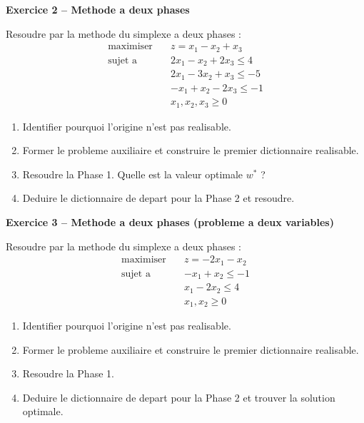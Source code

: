 \documentclass[12pt,a4paper]{article}
\begin{document}
\begin{exemple}
\textbf{Exercice 2 -- Methode a deux phases}

Resoudre par la methode du simplexe a deux phases :
\begin{align*}
\text{maximiser} \quad & z = x_1 - x_2 + x_3\\
\text{sujet a} \quad & 2x_1 - x_2 + 2x_3 \leq 4\\
& 2x_1 - 3x_2 + x_3 \leq -5\\
& -x_1 + x_2 - 2x_3 \leq -1\\
& x_1, x_2, x_3 \geq 0
\end{align*}

\begin{enumerate}
    \item Identifier pourquoi l'origine n'est pas realisable.
    \item Former le probleme auxiliaire et construire le premier dictionnaire realisable.
    \item Resoudre la Phase 1. Quelle est la valeur optimale $w^*$ ?
    \item Deduire le dictionnaire de depart pour la Phase 2 et resoudre.
\end{enumerate}
\end{exemple}

\begin{exemple}
\textbf{Exercice 3 -- Methode a deux phases (probleme a deux variables)}

Resoudre par la methode du simplexe a deux phases :
\begin{align*}
\text{maximiser} \quad & z = -2x_1 - x_2\\
\text{sujet a} \quad & -x_1 + x_2 \leq -1\\
& x_1 - 2x_2 \leq 4\\
& x_1, x_2 \geq 0
\end{align*}

\begin{enumerate}
    \item Identifier pourquoi l'origine n'est pas realisable.
    \item Former le probleme auxiliaire et construire le premier dictionnaire realisable.
    \item Resoudre la Phase 1.
    \item Deduire le dictionnaire de depart pour la Phase 2 et trouver la solution optimale.
\end{enumerate}
\end{exemple}
\end{document}
